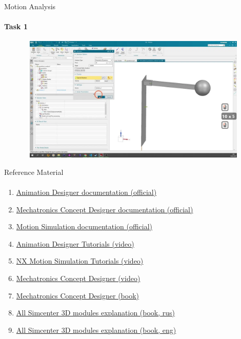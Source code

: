 \documentclass[aspectratio=169]{beamer}
\newcommand{\fbckg}[1]{\usebackgroundtemplate{\texttt{[image: \#1]}}}%
\begin{document}
\begin{frame}[t]{Motion Analysis}
    \framesubtitle{Task 1}
    \vspace{-0.6cm}
    \begin{figure}[H]
        \href{https://disk.yandex.ru/i/RsjuS-pJY70Oww}{
            \centering\includegraphics[height=6cm,width=1\textwidth,keepaspectratio]{motion_video_preview.png}}
        \label{fig:motion_video_preview.png}
    \end{figure}
\end{frame}

\begin{frame}[t]{Reference Material}
\framesubtitle{}
\footnotesize
\begin{enumerate}
    \item \href{https://docs.sw.siemens.com/en-US/doc/209349590/PL20200605195244930.motion_designer/xid1334514}{Animation Designer documentation (official)}
    \item \href{https://docs.sw.siemens.com/en-US/doc/209349590/PL20200605195244930.mechatronics/id1101745}{Mechatronics Concept Designer documentation (official)}
    \item \href{https://docs.sw.siemens.com/en-US/doc/289054037/PL20201105153211099.motion/id563951}{Motion Simulation documentation (official)}
    \item \href{https://www.youtube.com/playlist?list=PLY2AphaX4SYcoXBPIjkHmph8JAtYcI90L}{Animation Designer Tutorials (video)}
    \item \href{https://www.youtube.com/playlist?list=PLY8N5WFx1MGAsxH7G49ey37QC_nFtQ72E}{NX Motion Simulation Tutorials (video)}
    \item \href{https://www.youtube.com/playlist?list=PLO4e9B3weuKLBmu6BEQkx3K7wE9GB_LL3}{Mechatronics Concept Designer (video)}
    \item \href{http://www2.me.rochester.edu/courses/ME204/nx_help/en_US/graphics/fileLibrary/nx/mechtronics/MCD_Quick_Start.pdf}{Mechatronics Concept Designer (book)}
    \item \href{https://www.clio-soft.ru/wp-content/uploads/2020/12/siemens-sw-simcenter-3d-solution-guide-e-book-russian.pdf}{All Simcenter 3D modules explanation (book, rus)}
    \item \href{https://www.ata-e.com/wp-content/uploads/2021/10/Siemens_Simcenter_3D_Solutions_Guide_e-Book_SET.pdf}{All Simcenter 3D modules explanation (book, eng)}
\end{enumerate}
    
\end{frame}

\fbckg{fibeamer/figs/last_page.png}
\frame[plain]{}
\end{document}
